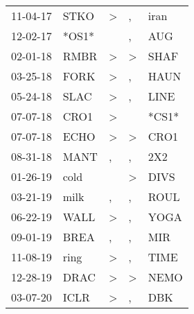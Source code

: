 \begin{supertabular}{p{0.07\textwidth}p{0.06\textwidth}p{0.02\textwidth}p{0.02\textwidth}p{0.06\textwidth}}
          11-04-17\textsuperscript{} &           STKO\textsuperscript{} &     \textgreater &                , &           iran\textsuperscript{} \\
          12-02-17\textsuperscript{} &                            *OS1* &                  &                , &            AUG\textsuperscript{} \\
          02-01-18\textsuperscript{} &           RMBR\textsuperscript{} &     \textgreater &     \textgreater &           SHAF\textsuperscript{} \\
          03-25-18\textsuperscript{} &           FORK\textsuperscript{} &     \textgreater &                , &           HAUN\textsuperscript{} \\
          05-24-18\textsuperscript{} &           SLAC\textsuperscript{} &     \textgreater &                , &           LINE\textsuperscript{} \\
          07-07-18\textsuperscript{} &           CRO1\textsuperscript{} &     \textgreater &                  &                            *CS1* \\
          07-07-18\textsuperscript{} &           ECHO\textsuperscript{} &     \textgreater &     \textgreater &           CRO1\textsuperscript{} \\
          08-31-18\textsuperscript{} &           MANT\textsuperscript{} &                , &                , &            2X2\textsuperscript{} \\
          01-26-19\textsuperscript{} &           cold\textsuperscript{} &                  &     \textgreater &           DIVS\textsuperscript{} \\
          03-21-19\textsuperscript{} &           milk\textsuperscript{} &                , &                , &           ROUL\textsuperscript{} \\
          06-22-19\textsuperscript{} &           WALL\textsuperscript{} &     \textgreater &                , &           YOGA\textsuperscript{} \\
          09-01-19\textsuperscript{} &           BREA\textsuperscript{} &                , &                , &            MIR\textsuperscript{} \\
          11-08-19\textsuperscript{} &           ring\textsuperscript{} &     \textgreater &                , &           TIME\textsuperscript{} \\
          12-28-19\textsuperscript{} &           DRAC\textsuperscript{} &     \textgreater &     \textgreater &           NEMO\textsuperscript{} \\
          03-07-20\textsuperscript{} &           ICLR\textsuperscript{} &     \textgreater &                , &            DBK\textsuperscript{} \\
\end{supertabular}
